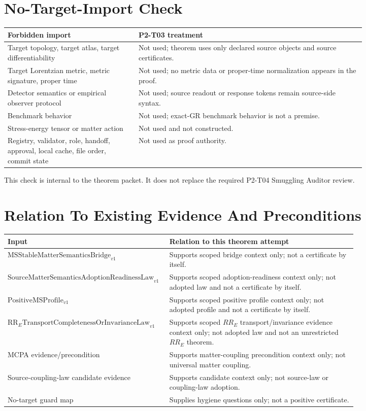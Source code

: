 \documentclass[11pt]{article}
\newcommand{\PositiveMSProfile}{\mathrm{PositiveMSProfile}_{v1}}
\newcommand{\SMSAR}{\mathrm{SourceMatterSemanticsAdoptionReadinessLaw}_{v1}}
\newcommand{\LawRR}{\mathrm{RR}_{E}\mathrm{TransportCompletenessOrInvarianceLaw}_{v1}}
\newcommand{\MSStable}{\mathrm{MSStableMatterSemanticsBridge}_{v1}}
\begin{document}
\section{No-Target-Import Check}

\begin{longtable}{p{0.30\linewidth}p{0.52\linewidth}}
\toprule
Forbidden import & P2-T03 treatment \\
\midrule
Target topology, target atlas, target differentiability & Not used; theorem
uses only declared source objects and source certificates. \\
Target Lorentzian metric, metric signature, proper time & Not used; no metric
data or proper-time normalization appears in the proof. \\
Detector semantics or empirical observer protocol & Not used; source readout
or response tokens remain source-side syntax. \\
Benchmark behavior & Not used; exact-GR benchmark behavior is not a premise. \\
Stress-energy tensor or matter action & Not used and not constructed. \\
Registry, validator, role, handoff, approval, local cache, file order, commit
state & Not used as proof authority. \\
\bottomrule
\end{longtable}

This check is internal to the theorem packet. It does not replace the required
P2-T04 Smuggling Auditor review.

\section{Relation To Existing Evidence And Preconditions}

\begin{longtable}{p{0.28\linewidth}p{0.52\linewidth}}
\toprule
Input & Relation to this theorem attempt \\
\midrule
\(\MSStable\) & Supports scoped bridge context only; not a certificate by
itself. \\
\(\SMSAR\) & Supports scoped adoption-readiness context only; not adopted law
and not a certificate by itself. \\
\(\PositiveMSProfile\) & Supports scoped positive profile context only; not
adopted profile and not a certificate by itself. \\
\(\LawRR\) & Supports scoped \(RR_E\) transport/invariance evidence context
only; not adopted law and not an unrestricted \(RR_E\) theorem. \\
MCPA evidence/precondition & Supports matter-coupling precondition context
only; not universal matter coupling. \\
Source-coupling-law candidate evidence & Supports candidate context only; not
source-law or coupling-law adoption. \\
No-target guard map & Supplies hygiene questions only; not a positive
certificate. \\
\bottomrule
\end{longtable}
\end{document}
